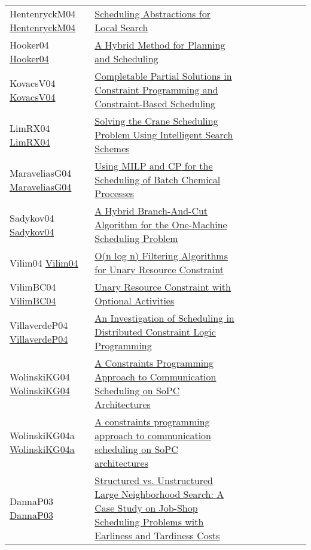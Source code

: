 {\begin{longtable}{p{3cm}p{7cm}lllllll}
HentenryckM04 \href{https://doi.org/10.1007/978-3-540-24664-0\_22}{HentenryckM04} &  \href{papers/HentenryckM04.pdf}{Scheduling Abstractions for Local Search} &  &  &  &  &  &  & \\
Hooker04 \href{https://doi.org/10.1007/978-3-540-30201-8\_24}{Hooker04} &  \href{papers/Hooker04.pdf}{A Hybrid Method for Planning and Scheduling} &  &  &  &  &  &  & \\
KovacsV04 \href{https://doi.org/10.1007/978-3-540-30201-8\_26}{KovacsV04} &  \href{papers/KovacsV04.pdf}{Completable Partial Solutions in Constraint Programming and Constraint-Based Scheduling} &  &  &  &  &  &  & \\
LimRX04 \href{https://doi.org/10.1007/978-3-540-30201-8\_59}{LimRX04} &  \href{papers/LimRX04.pdf}{Solving the Crane Scheduling Problem Using Intelligent Search Schemes} &  &  &  &  &  &  & \\
MaraveliasG04 \href{https://doi.org/10.1007/978-3-540-24664-0\_1}{MaraveliasG04} &  \href{papers/MaraveliasG04.pdf}{Using {MILP} and {CP} for the Scheduling of Batch Chemical Processes} &  &  &  &  &  &  & \\
Sadykov04 \href{https://doi.org/10.1007/978-3-540-24664-0\_31}{Sadykov04} &  \href{papers/Sadykov04.pdf}{A Hybrid Branch-And-Cut Algorithm for the One-Machine Scheduling Problem} &  &  &  &  &  &  & \\
Vilim04 \href{https://doi.org/10.1007/978-3-540-24664-0\_23}{Vilim04} &  \href{papers/Vilim04.pdf}{O(n log n) Filtering Algorithms for Unary Resource Constraint} &  &  &  &  &  &  & \\
VilimBC04 \href{https://doi.org/10.1007/978-3-540-30201-8\_8}{VilimBC04} &  \href{papers/VilimBC04.pdf}{Unary Resource Constraint with Optional Activities} &  &  &  &  &  &  & \\
VillaverdeP04 \href{}{VillaverdeP04} &  \href{}{An Investigation of Scheduling in Distributed Constraint Logic Programming} &  &  &  &  &  &  & \\
WolinskiKG04 \href{https://doi.org/10.1109/DSD.2004.1333291}{WolinskiKG04} &  \href{papers/WolinskiKG04.pdf}{A Constraints Programming Approach to Communication Scheduling on SoPC Architectures} &  &  &  &  &  &  & \\
WolinskiKG04a \href{https://doi.org/10.1145/968280.968336}{WolinskiKG04a} &  \href{}{A constraints programming approach to communication scheduling on SoPC architectures} &  &  &  &  &  &  & \\
DannaP03 \href{https://doi.org/10.1007/978-3-540-45193-8\_59}{DannaP03} &  \href{papers/DannaP03.pdf}{Structured vs. Unstructured Large Neighborhood Search: {A} Case Study on Job-Shop Scheduling Problems with Earliness and Tardiness Costs} &  &  &  &  &  &  & \\

\end{longtable}}
